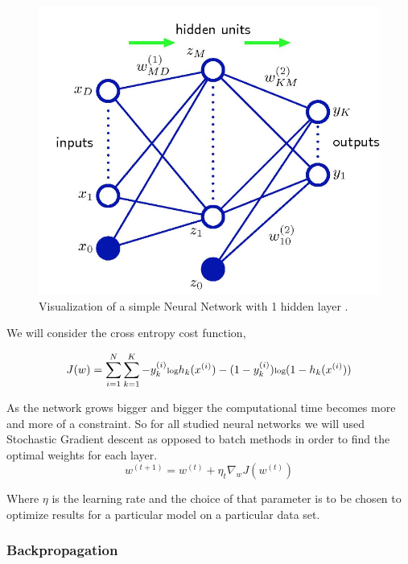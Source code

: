 \documentclass[12pt, twocolumn]{article}
\begin{document}
\begin{figure}
\includegraphics[scale=.6]{simpleNN.png}

\caption{Visualization of a simple Neural Network with 1 hidden layer \cite{Bishop} . }
\label{fig:basicNN}
\end{figure}


We will consider the cross entropy cost function, 

\begin{equation}
\scriptsize
J(w)= \sum_{i=1}^N \sum_{k=1}^K -y^{(i)}_k \textrm{log}h_k(x^{(i)})- (1 -y^{(i)}_k) \textrm{log}(1 -h_k(x^{(i)}))
\end {equation}



As the network grows bigger and bigger the computational time becomes more and more of a constraint. So for all studied neural  networks we will used Stochastic Gradient descent as opposed to batch methods in order to find the optimal weights for each layer. 
\begin{equation}
w^{(t+1)} = w^{(t)} + \eta_t \nabla_w J(w^{(t)})
\end{equation}

Where $\eta$ is  the learning rate and the choice of that parameter is to be chosen to optimize results for a particular model on a particular data set.


\subsubsection{Backpropagation}
\end{document}
